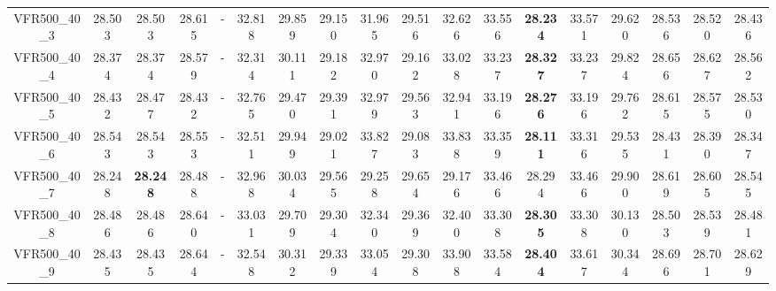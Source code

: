 \begin{tabular}{cc|ccc|ccccccccccccc}
VFR500\_40\_3      & 28.503           & 28.503           & 28.615           & -                & 32.818           & 29.859           & 29.150           & 31.965           & 29.516           & 32.626           & 33.556           & {\bf 28.234}     & 33.571           & 29.620           & 28.536           & 28.520           & 28.436          \\ 
VFR500\_40\_4      & 28.374           & 28.374           & 28.579           & -                & 32.314           & 30.111           & 29.182           & 32.970           & 29.162           & 33.028           & 33.237           & {\bf 28.327}     & 33.237           & 29.824           & 28.656           & 28.627           & 28.562          \\ 
VFR500\_40\_5      & 28.432           & 28.477           & 28.432           & -                & 32.765           & 29.470           & 29.391           & 32.979           & 29.563           & 32.941           & 33.196           & {\bf 28.276}     & 33.196           & 29.762           & 28.615           & 28.575           & 28.530          \\ 
VFR500\_40\_6      & 28.543           & 28.543           & 28.553           & -                & 32.511           & 29.949           & 29.021           & 33.827           & 29.083           & 33.838           & 33.359           & {\bf 28.111}     & 33.316           & 29.535           & 28.431           & 28.390           & 28.347          \\ 
VFR500\_40\_7      & 28.248           & {\bf 28.248}     & 28.488           & -                & 32.968           & 30.034           & 29.565           & 29.258           & 29.654           & 29.176           & 33.466           & 28.294           & 33.466           & 29.900           & 28.619           & 28.605           & 28.545          \\ 
VFR500\_40\_8      & 28.486           & 28.486           & 28.640           & -                & 33.031           & 29.709           & 29.304           & 32.340           & 29.369           & 32.400           & 33.308           & {\bf 28.305}     & 33.308           & 30.130           & 28.503           & 28.539           & 28.481          \\ 
VFR500\_40\_9      & 28.435           & 28.435           & 28.644           & -                & 32.548           & 30.312           & 29.339           & 33.054           & 29.308           & 33.908           & 33.584           & {\bf 28.404}     & 33.617           & 30.344           & 28.696           & 28.701           & 28.629          \\ 

\end{tabular}
